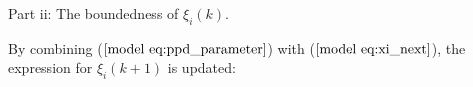 \documentclass[journal,onecolumn]{IEEEtran}
\begin{document}
Part ii: The boundedness of $ \xi_i(k)$.

By combining ($ \ref{model eq:ppd_parameter} $) with ($ \ref{model eq:xi_next} $), the expression for \(\xi_i(k+1)\) is updated:
\end{document}
